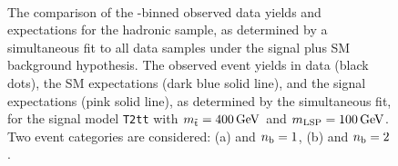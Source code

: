 \begin{figure}[t!]
  \begin{center}
     \\
    \caption{\label{fig:t2tt-best-fit-400_100}The comparison of
      the \scalht-binned observed data yields and expectations for the
      hadronic sample, as determined by a simultaneous fit to all data
      samples under the signal plus SM background hypothesis. The
      observed event yields in data (black dots), the SM expectations
      (dark blue solid line), and the signal expectations (pink solid
      line), as determined by the simultaneous fit, for the
      signal model \texttt{T2tt} with $m_{\tilde{\rm t}} = 400\,\text{Ge\hspace{-.08em}V}$ and
      $m_{\text{LSP}} = 100\,\text{Ge\hspace{-.08em}V}$. Two event categories are
      considered: (a) \njethigh and $n_{\text{b}} = 1$, (b) \njethigh and
      $n_{\text{b}} = 2$.}
  \end{center}
\end{figure}
